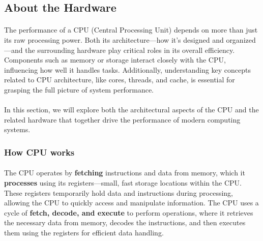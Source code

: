 \subsection{About the Hardware}

    \paragraph*{}
    The performance of a CPU (Central Processing Unit) depends on more than just its raw processing power. 
    Both its architecture—how it’s designed and organized—and the surrounding hardware play critical roles in 
    its overall efficiency. Components such as memory or storage interact closely with the CPU, influencing how well 
    it handles tasks. Additionally, understanding key concepts related to CPU architecture, like cores, threads, and cache, 
    is essential for grasping the full picture of system performance. 
    \par

    \vspace{-1em}

    \paragraph*{}
    In this section, we will explore both the architectural aspects of the CPU and the related hardware that together 
    drive the performance of modern computing systems.
    \par



\subsubsection{How CPU works}

    \paragraph*{}
    The CPU operates by \textbf{fetching} instructions and data from memory, which it \textbf{processes} using its registers—small, 
    fast storage locations within the CPU. These registers temporarily hold data and instructions during processing, 
    allowing the CPU to quickly access and manipulate information. The CPU uses a cycle of \textbf{fetch, decode, and execute} 
    to perform operations, where it retrieves the necessary data from memory, decodes the instructions, and then executes 
    them using the registers for efficient data handling.
    \par

